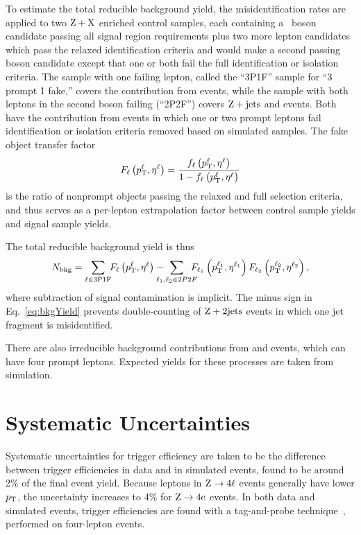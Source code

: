 To estimate the total reducible background yield, the misidentification rates are applied to two $\mathrm{Z}+\mathrm{X}$ enriched control samples, each containing a {\PZ}~boson candidate passing all signal region requirements plus two more lepton candidates which pass the relaxed identification criteria and would make a second passing {\PZ} boson candidate except that one or both fail the full identification or isolation criteria.
The sample with one failing lepton, called the ``3P1F'' sample for ``3 prompt 1 fake,'' covers the contribution from {\WZ} events, while the sample with both leptons in the second {\PZ} boson failing (``2P2F'') covers $\mathrm{Z}+\text{jets}$ and {\TTbar} events.
Both have the contribution from {\ZZ} events in which one or two prompt leptons fail identification or isolation criteria removed based on simulated samples.
The fake object transfer factor
\begin{equation}
  F_\ell\left(p_\mathrm{T}^\ell,\eta^\ell\right) = \frac{f_\ell\left(p_\mathrm{T}^\ell, \eta^\ell\right)}{1 - f_\ell\left(p_\mathrm{T}^\ell, \eta^\ell\right)}
\end{equation}
is the ratio of nonprompt objects passing the relaxed and full selection criteria, and thus serves as a per-lepton extrapolation factor between control sample yields and signal sample yields.

The total reducible background yield is thus
\begin{equation}\label{eq:bkgYield}
  N_\text{bkg} = \sum_{\ell \in \text{3P1F}} \! \! F_\ell\left(\pt^\ell,\eta^\ell\right) - \! \! \! \! \! \! \sum_{\ell_1,\ell_2 \in 2P2F} \! \! \! \! \! F_{\ell_1}\left(\pt^{\ell_1},\eta^{\ell_1}\right)F_{\ell_2}\left(\pt^{\ell_2},\eta^{\ell_2}\right),
\end{equation}
where subtraction of signal contamination is implicit.
The minus sign in Eq.~\ref{eq:bkgYield} prevents double-counting of $\mathrm{Z}+2\text{jets}$ events in which one jet fragment is misidentified.

There are also irreducible background contributions from {\TTZ} and {\WWZ} events, which can have four prompt leptons.
Expected yields for these processes are taken from simulation.



\section{Systematic Uncertainties}

Systematic uncertainties for trigger efficiency are taken to be the difference between trigger efficiencies in data and in simulated events, found to be around 2\% of the final event yield.
Because leptons in $\mathrm{Z} \to 4\ell$ events generally have lower $p_\mathrm{T}$, the uncertainty increases to 4\% for $\mathrm{Z} \to 4\mathrm{e}$ events.
In both data and simulated events, trigger efficiencies are found with a tag-and-probe technique~\cite{CMS:2011aa}, performed on four-lepton events.

